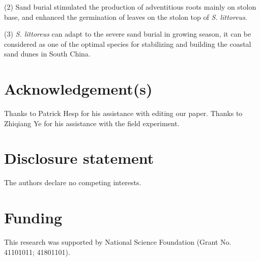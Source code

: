 \documentclass[]{interact}
\theoremstyle{plain}%
\theoremstyle{definition}
\theoremstyle{remark}
\begin{document}
(2) Sand burial stimulated the production of adventitious roots mainly on stolon base, and enhanced the germination of leaves on the stolon top of \textit{S. littoreus}.

(3) \textit{S. littoreus} can adapt to the severe sand burial in growing season, it can be considered as one of the optimal species for stabilizing and building the coastal sand dunes in South China. 


\section*{Acknowledgement(s)}

Thanks to Patrick Hesp for his assistance with editing our paper. Thanks to Zhiqiang Ye for his assistance with the field experiment.

\section*{Disclosure statement}

The authors declare no competing interests. 

\section*{Funding}

This research was supported by National Science Foundation (Grant No. 41101011; 41801101). 
\end{document}
